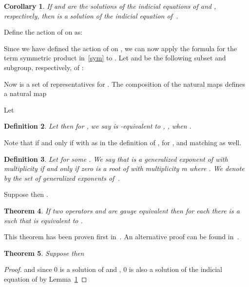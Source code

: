\documentclass{article}
\newtheorem{theorem}{Theorem}[section]
\newtheorem{corollary}[theorem]{Corollary}
\newtheorem{definition}[theorem]{Definition}
\begin{document}
\begin{corollary}
\label{indsym}
If  and  are the solutions of the indicial equations of  and ,
respectively, then  is a solution of the indicial equation of~.
\end{corollary}






Define the action of  on  as:


Since we have defined the action of  on , we can now apply the formula for the
term symmetric product in~\eqref{sym} to .  Let  and  be the
following subset and subgroup, respectively, of :



Now  is a set of representatives for . The composition of the
natural maps  defines a natural map

Let



\begin{definition}\label{def:req}
Let  then for , we say  is -equivalent to , , when .
\end{definition}


Note that  if and only if  with  as
in the definition of ,  for , and  matching as well.


\begin{definition}
  Let  for some . We say that  is a {\em generalized exponent} of
   with multiplicity  if and only if zero is a root of  with
  multiplicity m where . We denote by 
  the set of generalized exponents of~.
\end{definition}

Suppose  then .



\begin{theorem}
\label{genexp}
If two operators  and  are gauge equivalent then for each  there is a  such that  is equivalent to .
\end{theorem}
This theorem has been proven first in~\cite{CHG10}. An alternative proof can be found in~\cite{YC11}.




\begin{theorem}\label{symgen}
Suppose  then 

\end{theorem}

\begin{proof}
   and since 0 is a solution of  and , 0 is also a solution of
  the indicial equation of  by
  Lemma~\ref{indsym}
\end{proof}
\end{document}
